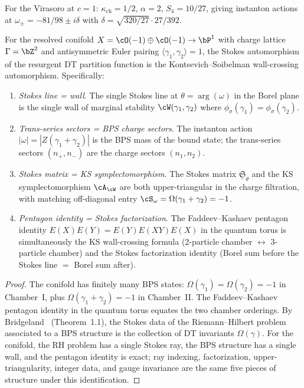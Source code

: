 \begin{conjecture}
For the Virasoro at $c = 1$: $\kappa_{\mathrm{ch}} = 1/2$, $\alpha = 2$, $S_4 = 10/27$, giving instanton actions at $\omega_\pm = -81/98 \pm i\delta$ with $\delta = \sqrt{320/27} \cdot 27/392$.
\end{conjecture}


\begin{theorem}[Stokes automorphism = KS wall-crossing: conifold case]
\label{thm:stokes-ks-conifold}
For the resolved conifold $X = \cO(-1) \oplus \cO(-1) \to \bP^1$ with charge lattice $\Gamma = \bZ^2$ and antisymmetric Euler pairing $\langle \gamma_1, \gamma_2 \rangle = 1$, the Stokes automorphism of the resurgent DT partition function is the Kontsevich--Soibelman wall-crossing automorphism. Specifically:
\begin{enumerate}[label=\textup{(\roman*)}]
 \item \emph{Stokes line = wall}. The single Stokes line at $\theta = \arg(\omega)$ in the Borel plane is the single wall of marginal stability $\cW(\gamma_1, \gamma_2)$ where $\phi_\sigma(\gamma_1) = \phi_\sigma(\gamma_2)$.
 \item \emph{Trans-series sectors = BPS charge sectors}. The instanton action $|\omega| = |Z(\gamma_1 + \gamma_2)|$ is the BPS mass of the bound state; the trans-series sectors $(n_+, n_-)$ are the charge sectors $(n_1, n_2)$.
 \item \emph{Stokes matrix = KS symplectomorphism}. The Stokes matrix $\underline{\mathfrak{S}}_\theta$ and the KS symplectomorphism $\cA_\cW$ are both upper-triangular in the charge filtration, with matching off-diagonal entry $\cS_\omega = \Omega(\gamma_1 + \gamma_2) = -1$.
 \item \emph{Pentagon identity = Stokes factorization}. The Faddeev--Kashaev pentagon identity $E(X)E(Y) = E(Y)E(XY)E(X)$ in the quantum torus is simultaneously the KS wall-crossing formula \textup{(}2-particle chamber $\leftrightarrow$ 3-particle chamber\textup{)} and the Stokes factorization identity \textup{(}Borel sum before the Stokes line $=$ Borel sum after\textup{)}.
\end{enumerate}
\end{theorem}

\begin{proof}
The conifold has finitely many BPS states: $\Omega(\gamma_1) = \Omega(\gamma_2) = -1$ in Chamber~I, plus $\Omega(\gamma_1 + \gamma_2) = -1$ in Chamber~II. The Faddeev--Kashaev pentagon identity in the quantum torus equates the two chamber orderings. By Bridgeland~\cite{Bridgeland2019RH} (Theorem~1.1), the Stokes data of the Riemann--Hilbert problem associated to a BPS structure is the collection of DT invariants $\Omega(\gamma)$. For the conifold, the RH problem has a single Stokes ray, the BPS structure has a single wall, and the pentagon identity is exact; ray indexing, factorization, upper-triangularity, integer data, and gauge invariance are the same five pieces of structure under this identification.
\end{proof}

